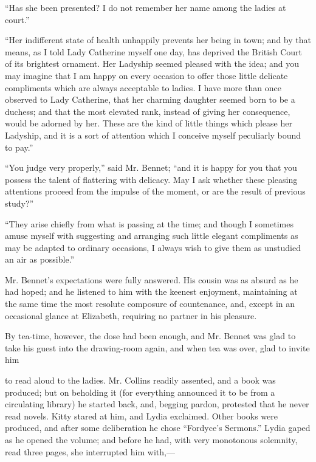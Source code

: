 ``Has she been presented? I do not remember her name among the ladies at court.''

``Her indifferent state of health unhappily prevents her being in town; and by that means, as I told Lady Catherine myself one day, has deprived the British Court of its brightest ornament. Her Ladyship seemed pleased with the idea; and you may imagine that I am happy on every occasion to offer those little delicate compliments which are always acceptable to ladies. I have more than once observed to Lady Catherine, that her charming daughter seemed born to be a duchess; and that the most elevated rank, instead of giving her consequence, would be adorned by her. These are the kind of little things which please her Ladyship, and it is a sort of attention which I conceive myself peculiarly bound to pay.''

``You judge very properly,'' said Mr. Bennet; ``and it is happy for you that you possess the talent of flattering with delicacy. May I ask whether these pleasing attentions proceed from the impulse of the moment, or are the result of previous study?''

``They arise chiefly from what is passing at the time; and though I sometimes amuse myself with suggesting and arranging such little elegant compliments as may be adapted to ordinary occasions, I always wish to give them as unstudied an air as possible.''

Mr. Bennet's expectations were fully answered. His cousin was as absurd as he had hoped; and he listened to him with the keenest enjoyment, maintaining at the same time the most resolute composure of countenance, and, except in an occasional glance at Elizabeth, requiring no partner in his pleasure.

By tea-time, however, the dose had been enough, and Mr. Bennet was glad to take his guest into the drawing-room again, and when tea was over, glad to invite him




to read aloud to the ladies. Mr. Collins readily assented, and a book was produced; but on beholding it (for everything announced it to be from a circulating library) he started back, and, begging pardon, protested that he never read novels. Kitty stared at him, and Lydia exclaimed. Other books were produced, and after some deliberation he chose ``Fordyce's Sermons.'' Lydia gaped as he opened the volume; and before he had, with very monotonous solemnity, read three pages, she interrupted him with,---

